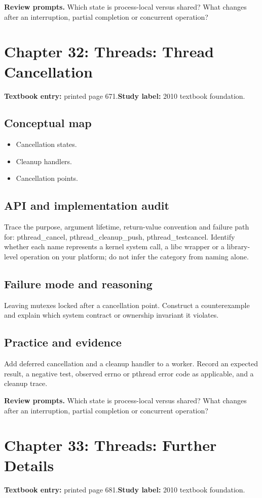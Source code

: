 \documentclass[11pt,letterpaper,oneside]{report}
\begin{document}
\textbf{Review prompts.} Which state is process-local versus shared? What changes after an interruption, partial completion or concurrent operation?

\section{Chapter 32: Threads: Thread Cancellation}
\textbf{Textbook entry:} printed page 671.\quad \textbf{Study label:} 2010 textbook foundation.

\subsection{Conceptual map}
\begin{itemize}
\item Cancellation states.
\item Cleanup handlers.
\item Cancellation points.
\end{itemize}
\subsection{API and implementation audit}
Trace the purpose, argument lifetime, return-value convention and failure path for: pthread\_cancel, pthread\_cleanup\_push, pthread\_testcancel. Identify whether each name represents a kernel system call, a libc wrapper or a library-level operation on your platform; do not infer the category from naming alone.

\subsection{Failure mode and reasoning}
Leaving mutexes locked after a cancellation point. Construct a counterexample and explain which system contract or ownership invariant it violates.

\subsection{Practice and evidence}
Add deferred cancellation and a cleanup handler to a worker. Record an expected result, a negative test, observed errno or pthread error code as applicable, and a cleanup trace.

\textbf{Review prompts.} Which state is process-local versus shared? What changes after an interruption, partial completion or concurrent operation?

\section{Chapter 33: Threads: Further Details}
\textbf{Textbook entry:} printed page 681.\quad \textbf{Study label:} 2010 textbook foundation.
\end{document}
